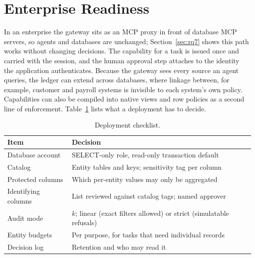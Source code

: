 \documentclass[10pt,journal,compsoc]{IEEEtran}
\begin{document}
\begin{table}[!t]
\caption{End-to-end MCP deployment on PostgreSQL at TPC-H scale factor $\approx$1 (\Neesessions{} sessions, \Neequeries{} queries). \emph{Parity}: decisions equal to the in-process library. Times in ms, median / 95th percentile; \emph{Transport}: round trip minus check and execution, median.}
\label{tab:e2e}
\centering\scriptsize
\setlength{\tabcolsep}{2.5pt}
\end{table}

\section{Enterprise Readiness}\label{sec:enterprise}
In an enterprise the gateway sits as an MCP proxy in front of database MCP servers, so agents and databases are unchanged; Section~\ref{sec:rq7} shows this path works without changing decisions. The capability for a task is issued once and carried with the session, and the human approval step attaches to the identity the application authenticates. Because the gateway sees every source an agent queries, the ledger can extend across databases, where linkage between, for example, customer and payroll systems is invisible to each system's own policy. Capabilities can also be compiled into native views and row policies as a second line of enforcement. Table~\ref{tab:checklist} lists what a deployment has to decide.

\begin{table}[!t]
\caption{Deployment checklist.}
\label{tab:checklist}
\centering\footnotesize
\begin{tabular}{@{}p{}p{}@{}}
\toprule
Item & Decision\\
\midrule
Database account & SELECT-only role, read-only transaction default\\
Catalog & Entity tables and keys; sensitivity tag per column\\
Protected columns & Which per-entity values may only be aggregated\\
Identifying columns & List reviewed against catalog tags; named approver\\
Audit mode & $k$; linear (exact filters allowed) or strict (simulatable refusals)\\
Entity budgets & Per purpose, for tasks that need individual records\\
Decision log & Retention and who may read it\\
\bottomrule
\end{tabular}
\end{table}
\end{document}
